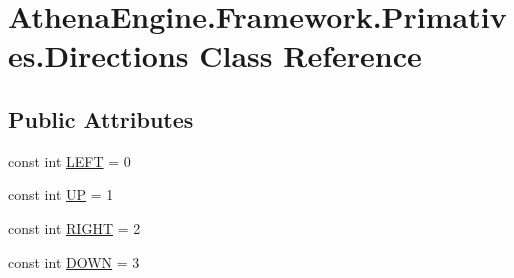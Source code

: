 \hypertarget{class_athena_engine_1_1_framework_1_1_primatives_1_1_directions}{\section{Athena\-Engine.\-Framework.\-Primatives.\-Directions Class Reference}
\label{class_athena_engine_1_1_framework_1_1_primatives_1_1_directions}
}
\subsection*{Public Attributes}
\begin{DoxyCompactItemize}
\item 
const int \hyperlink{class_athena_engine_1_1_framework_1_1_primatives_1_1_directions_aa076016101b61c3b9e8deaab0aeba1d4}{L\-E\-F\-T} = 0
\item 
const int \hyperlink{class_athena_engine_1_1_framework_1_1_primatives_1_1_directions_a1254ff22dcb4f165ad3f99f173230266}{U\-P} = 1
\item 
const int \hyperlink{class_athena_engine_1_1_framework_1_1_primatives_1_1_directions_a334d2b8ea11d69edbe92c3706c599d27}{R\-I\-G\-H\-T} = 2
\item 
const int \hyperlink{class_athena_engine_1_1_framework_1_1_primatives_1_1_directions_a9cf62eb2ec15dbeaaf21a4ed0e3a88c8}{D\-O\-W\-N} = 3
\end{DoxyCompactItemize}


